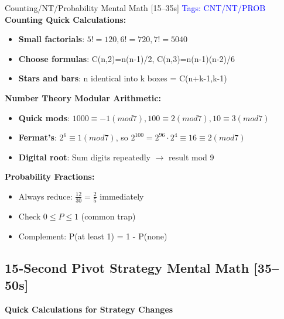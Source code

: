 \documentclass{article}
\begin{document}
\begin{mentalbox}{Counting/NT/Probability Mental Math [15--35s]}
{\footnotesize\textcolor{timegreen}{}}\quad\textcolor{blue}{Tags: CNT/NT/PROB}\\

\textbf{Counting Quick Calculations:}
\begin{itemize}[nosep]
\item \textbf{Small factorials}: $5!=120, 6!=720, 7!=5040$
\item \textbf{Choose formulas}: C(n,2)=n(n-1)/2, C(n,3)=n(n-1)(n-2)/6
\item \textbf{Stars and bars}: n identical into k boxes = C(n+k-1,k-1)
\end{itemize}

\textbf{Number Theory Modular Arithmetic:}
\begin{itemize}[nosep]
\item \textbf{Quick mods}: $1000 \equiv -1(mod 7), 100 \equiv 2(mod 7), 10 \equiv 3(mod 7)$
\item \textbf{Fermat's}: $2^6 \equiv 1(mod 7)$, so $2^{100}=2^{96}\cdot 2^4 \equiv 16 \equiv 2(mod 7)$
\item \textbf{Digital root}: Sum digits repeatedly $\rightarrow$ result mod 9
\end{itemize}

\textbf{Probability Fractions:}
\begin{itemize}[nosep]
\item Always reduce: $\frac{12}{30} = \frac{2}{5}$ immediately
\item Check $0\leq P\leq1$ (common trap)
\item Complement: P(at least 1) = 1 - P(none)
\end{itemize}
\end{mentalbox}

\subsection{15-Second Pivot Strategy Mental Math [35--50s]}
{\footnotesize\textcolor{timegreen}{}}\quad\textbf{Quick Calculations for Strategy Changes}
\end{document}
